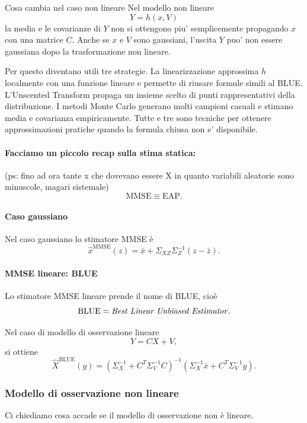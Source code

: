 \documentclass[11pt,a4paper]{article}
\begin{document}
\begin{spiegazione}{Cosa cambia nel caso non lineare}
Nel modello non lineare
\[
Y=h(x,V)
\]
la media e le covarianze di $Y$ non si ottengono piu' semplicemente propagando $x$ con una matrice $C$. Anche se $x$ e $V$ sono gaussiani, l'uscita $Y$ puo' non essere gaussiana dopo la trasformazione non lineare.

Per questo diventano utili tre strategie. La linearizzazione approssima $h$ localmente con una funzione lineare e permette di riusare formule simili al BLUE. L'Unscented Transform propaga un insieme scelto di punti rappresentativi della distribuzione. I metodi Monte Carlo generano molti campioni casuali e stimano media e covarianza empiricamente. Tutte e tre sono tecniche per ottenere approssimazioni pratiche quando la formula chiusa non e' disponibile.
\end{spiegazione}


\paragraph{Facciamo un piccolo recap sulla stima statica:} (ps: fino ad ora tante x che dovevano essere X in quanto variabili aleatorie sono minuscole, magari sistemale)
\[
\mathrm{MMSE} \equiv \mathrm{EAP}.
\]

\paragraph{Caso gaussiano}
Nel caso gaussiano lo stimatore MMSE è
\[
\hat x^{\mathrm{MMSE}}(z)
=
\bar x+\Sigma_{XZ}\Sigma_Z^{-1}(z-\bar z).
\]

\paragraph{MMSE lineare: BLUE}
Lo stimatore MMSE lineare prende il nome di BLUE, cioè
\[
\mathrm{BLUE}
=
\text{\emph{Best Linear Unbiased Estimator}}.
\]

Nel caso di modello di osservazione lineare
\[
Y=CX+V,
\]
si ottiene
\[
\hat X^{\mathrm{BLUE}}(y)
=
\left(
\Sigma_X^{-1}+C^T\Sigma_V^{-1}C
\right)^{-1}
\left(
\Sigma_X^{-1}\bar x+C^T\Sigma_V^{-1}y
\right).
\]

\subsubsection*{Modello di osservazione non lineare}

Ci chiediamo cosa accade se il modello di osservazione non è lineare.
\end{document}
